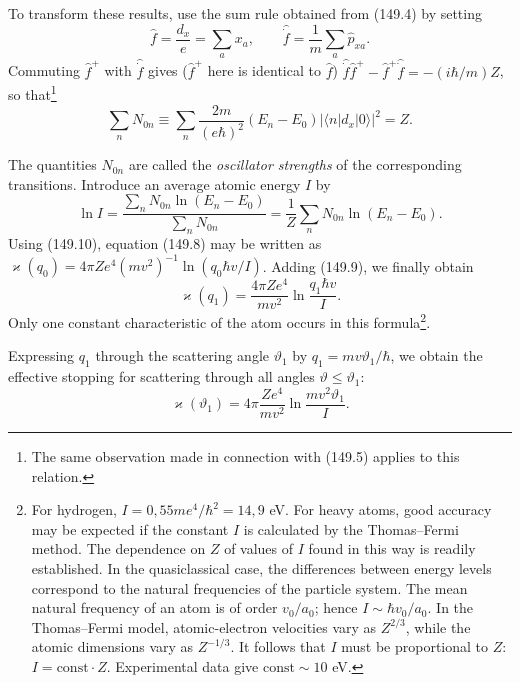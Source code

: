 To transform these results, use the sum rule obtained from (149.4) by setting
\[
 \hat f=\frac{d_x}{e}=\sum_a x_a,\qquad
 \hat{\dot f}=\frac1m\sum_a\hat p_{xa}.
\]
Commuting $\hat f^+$ with $\hat{\dot f}$ gives ($\hat f^+$ here is identical to $\hat f$)
$\hat{\dot f}\hat f^+-\hat f^+\hat{\dot f}=-(i\hbar/m)Z$, so that\footnote{The same observation made in connection with (149.5) applies to this relation.}
\begin{equation}
 \sum_nN_{0n}\equiv\sum_n\frac{2m}{(e\hbar)^2}(E_n-E_0)
 |\langle n|d_x|0\rangle|^2=Z.
 \tag{149.10}
\end{equation}

The quantities $N_{0n}$ are called the \emph{oscillator strengths} of the corresponding transitions. Introduce an average atomic energy $I$ by
\begin{equation}
 \ln I=\frac{\sum_nN_{0n}\ln(E_n-E_0)}{\sum_nN_{0n}}
 =\frac1Z\sum_nN_{0n}\ln(E_n-E_0).
 \tag{149.11}
\end{equation}
Using (149.10), equation (149.8) may be written as
$\varkappa(q_0)=4\pi Ze^4(mv^2)^{-1}\ln(q_0\hbar v/I)$. Adding (149.9), we finally obtain
\begin{equation}
 \varkappa(q_1)=\frac{4\pi Ze^4}{mv^2}\ln\frac{q_1\hbar v}{I}.
 \tag{149.12}
\end{equation}
Only one constant characteristic of the atom occurs in this formula\footnote{For hydrogen, $I=0{,}55me^4/\hbar^2=14{,}9$ eV. For heavy atoms, good accuracy may be expected if the constant $I$ is calculated by the Thomas--Fermi method. The dependence on $Z$ of values of $I$ found in this way is readily established. In the quasiclassical case, the differences between energy levels correspond to the natural frequencies of the particle system. The mean natural frequency of an atom is of order $v_0/a_0$; hence $I\sim\hbar v_0/a_0$. In the Thomas--Fermi model, atomic-electron velocities vary as $Z^{2/3}$, while the atomic dimensions vary as $Z^{-1/3}$. It follows that $I$ must be proportional to $Z$: $I=\mathrm{const}\cdot Z$. Experimental data give $\mathrm{const}\sim10$ eV.}.

Expressing $q_1$ through the scattering angle $\vartheta_1$ by $q_1=mv\vartheta_1/\hbar$, we obtain the effective stopping for scattering through all angles $\vartheta\leqslant\vartheta_1$:
\begin{equation}
 \varkappa(\vartheta_1)=4\pi\frac{Ze^4}{mv^2}\ln\frac{mv^2\vartheta_1}{I}.
 \tag{149.13}
\end{equation}

